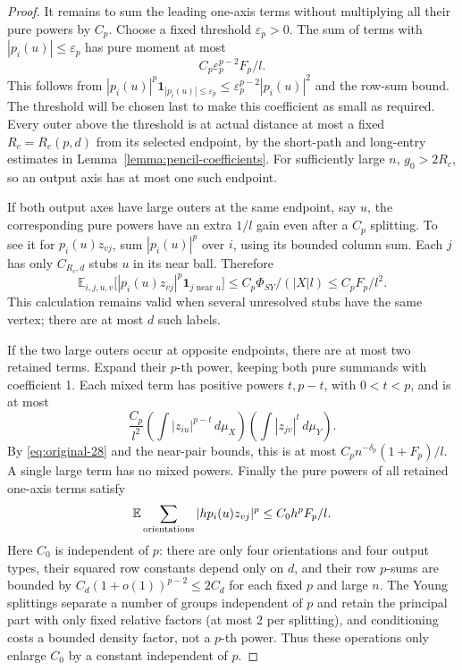 \begin{proof}
It remains to sum the leading one-axis terms without multiplying
all their pure powers by \(C_p\). Choose a fixed threshold
\(\varepsilon_p>0\). The sum of terms with
\(|p_i(u)|\le\varepsilon_p\) has pure moment at most
\[
 C_p\varepsilon_p^{p-2}F_p/l.
\]
This follows from
\(|p_i(u)|^p\mathbf1_{|p_i(u)|\le\varepsilon_p}
 \le\varepsilon_p^{p-2}|p_i(u)|^2\)
and the row-sum bound. The threshold will be chosen last to make
this coefficient as small as required.
Every outer above the threshold is at actual distance at most a
fixed \(R_c=R_c(p,d)\) from its selected endpoint, by the
short-path and long-entry estimates in
Lemma~\ref{lemma:pencil-coefficients}.
For sufficiently large \(n\), \(g_0>2R_c\), so an output axis
has at most one such endpoint.

If both output axes have large outers at the same endpoint, say
\(u\), the corresponding pure powers have an extra \(1/l\)
gain even after a \(C_p\) splitting. To see it for
\(p_i(u)z_{vj}\), sum \(|p_i(u)|^p\) over \(i\), using its
bounded column sum. Each \(j\) has only \(C_{R_c,d}\) stubs
\(u\) in its near ball. Therefore
\[
 \mathbb E_{i,j,u,v}
 \bigl[|p_i(u)z_{vj}|^p\mathbf1_{j\text{ near }u}\bigr]
 \le C_p\Phi_{SY}/(|X|l)\le C_pF_p/l^2.
\]
This calculation remains valid when several unresolved stubs have
the same vertex; there are at most \(d\) such labels.

If the two large outers occur at opposite endpoints, there are at
most two retained terms. Expand their \(p\)-th power, keeping
both pure summands with coefficient 1. Each mixed term has positive
powers \(t,p-t\), with \(0<t<p\), and is at most
\[
 \frac{C_p}{l^2}
  \left(\int|z_{iu}|^{p-t}\,d\mu_X\right)
  \left(\int|z_{jv}|^t\,d\mu_Y\right).
\]
By \eqref{eq:original-28} and the near-pair bounds, this is at most
\(C_p n^{-\delta_p}(1+F_p)/l\). A single large term has no
mixed powers. Finally the pure powers of all retained one-axis
terms satisfy
\[
 \mathbb E\sum_{\rm orientations}|h p_i(u)z_{vj}|^p
 \le C_0h^pF_p/l.
\]
Here \(C_0\) is independent of \(p\): there are only four
orientations and four output types, their squared row constants
depend only on \(d\), and their row \(p\)-sums are bounded by
\(C_d(1+o(1))^{p-2}\le2C_d\) for each fixed \(p\) and large
\(n\). The Young splittings separate a number of groups independent
of \(p\) and retain the principal part with only fixed relative
factors (at most 2 per splitting),
and conditioning costs a bounded density factor, not a \(p\)-th
power. Thus these operations only enlarge \(C_0\) by a constant
independent of \(p\).


\end{proof}
